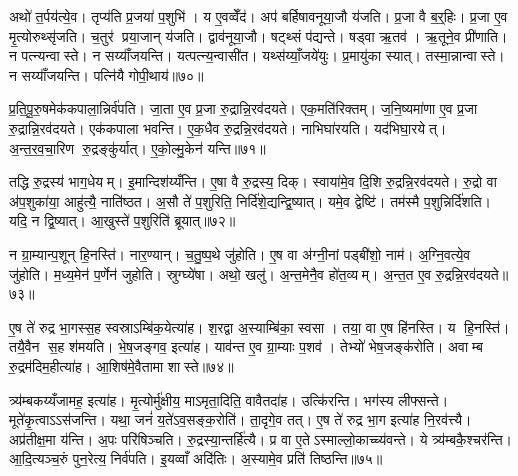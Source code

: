 अथो॑ त॒र्पय॑त्ये॒व। तृप्य॑ति प्र॒जया॑ प॒शुभि॑। य ए॒वव्वेँद॑। अप॑ बर्\mbox{}हिषावनूया॒जौ य॑जति। प्र॒जा वै ब॒र्॒हिः। प्र॒जा ए॒व मृ॒त्योरुथ्सृ॑जति। च॒तुर॑ प्रया॒जान् य॑जति। द्वाव॑नूया॒जौ। षट्थ्सं प॑द्यन्ते। षड्वा ऋ॒तव॑। ऋ॒तूने॒व प्री॑णाति। न पत्न्यन्वास्ते। न सय्याँ॑जयन्ति। यत्पत्न्य॒न्वासी॑त। यथ्स॑य्याँ॒जये॑युः। प्र॒मायु॑का स्यात्। तस्मा॒न्नान्वास्ते। न सय्याँ॑जयन्ति। पत्नि॑यै गोपी॒थाय॑॥७०॥

प्र॒ति॒पू॒रु॒षमेक॑कपाला॒न्निर्व॑पति। जा॒ता ए॒व प्र॒जा रु॒द्रान्नि॒रव॑दयते। एक॒मति॑रिक्तम्। ज॒नि॒ष्यमा॑णा ए॒व प्र॒जा रु॒द्रान्नि॒रव॑दयते। एक॑कपाला भवन्ति। ए॒क॒धैव रु॒द्रन्नि॒रव॑दयते। नाभिघा॑रयति। यद॑भिघा॒रयेत्। अ॒न्त॒र॒व॒चा॒रिण रु॒द्रङ्कु॑र्यात्। ए॒को॒ल्मु॒केन॑ यन्ति॥७१॥

तद्धि रु॒द्रस्य॑ भाग॒धेयम्। इ॒मान्दिश॑य्यँन्ति। ए॒षा वै रु॒द्रस्य॒ दिक्। स्वाया॑मे॒व दि॒शि रु॒द्रन्नि॒रव॑दयते। रु॒द्रो वा अ॑प॒शुका॑या॒ आहु॑त्यै॒ नाति॑ष्ठत। अ॒सौ ते॑ प॒शुरिति॒ निर्दि॑शे॒द्यन्द्वि॒ष्यात्। यमे॒व द्वेष्टि॑। तम॑स्मै प॒शुन्निर्दि॑शति। यदि॒ न द्वि॒ष्यात्। आ॒खुस्ते॑ प॒शुरिति॑ ब्रूयात्॥७२॥

न ग्रा॒म्यान्प॒शून् हि॒नस्ति॑। नार॒ण्यान्। च॒तु॒ष्प॒थे जु॑होति। ए॒ष वा अ॑ग्नी॒नां पड्बी॑शो॒ नाम॑। अ॒ग्नि॒वत्ये॒व जु॑होति। म॒ध्य॒मेन॑ प॒र्णेन॑ जुहोति। स्रुग्घ्ये॑षा। अथो॒ खलु॑। अ॒न्त॒मेनै॒व हो॑त॒व्यम्। अ॒न्त॒त ए॒व रु॒द्रन्नि॒रव॑दयते॥७३॥

ए॒ष ते॑ रुद्र भा॒गस्स॒ह स्वस्राऽम्बि॑क॒येत्या॑ह। श॒रद्वा अ॒स्याम्बि॑का॒ स्वसा। तया॒ वा ए॒ष हि॑नस्ति। य हि॒नस्ति॑। तयै॒वैन स॒ह श॑मयति। भे॒ष॒जङ्गव॒ इत्या॑ह। याव॑न्त ए॒व ग्रा॒म्याः प॒शव॑। तेभ्यो॑ भेष॒जङ्क॑रोति। अवाम्ब रु॒द्रम॑दिम॒हीत्या॑ह। आ॒शिष॑मे॒वैतामा शास्ते॥७४॥

त्र्य॑म्बकय्यँजामह॒ इत्या॑ह। मृ॒त्योर्मु॑क्षीय॒ माऽमृता॒दिति॒ वावैतदा॑ह। उत्कि॑रन्ति। भग॑स्य लीफ्सन्ते। मूते॑कृ॒त्वाऽऽस॑जन्ति। यथा॒ जनं॑ य॒ते॑ऽव॒सङ्क॒रोति॑। ता॒दृगे॒व तत्। ए॒ष ते॑ रुद्र भा॒ग इत्या॑ह नि॒रव॑त्त्यै। अप्र॑तीक्ष॒मा य॑न्ति। अ॒पः परि॑षिञ्चति। रु॒द्रस्या॒न्तर्\mbox{}हि॑त्यै। प्र वा ए॒तेऽस्माल्लो॒काच्च्य॑वन्ते। ये त्र्य॑म्बकै॒श्चर॑न्ति। आ॒दि॒त्यञ्च॒रुं पुन॒रेत्य॒ निर्व॑पति। इ॒यव्वाँ अदि॑तिः। अ॒स्यामे॒व प्रति॑ तिष्ठन्ति॥७५॥


